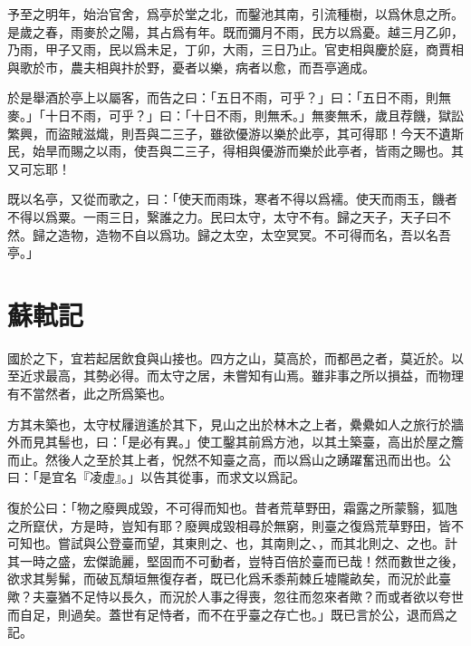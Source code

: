 予至之明年，始治官舍，爲亭於堂之北，而鑿池其南，引流種樹，以爲休息之所。是歲之春，雨麥於之陽，其占爲有年。既而彌月不雨，民方以爲憂。越三月乙卯，乃雨，甲子又雨，民以爲未足，丁卯，大雨，三日乃止。官吏相與慶於庭，商賈相與歌於市，農夫相與{抃}於野，憂者以樂，病者以愈，而吾亭適成。%

於是舉酒於亭上以屬客，而告之曰：「五日不雨，可乎？」曰：「五日不雨，則無麥。」「十日不雨，可乎？」曰：「十日不雨，則無禾。」無麥無禾，歲且{荐}饑，獄訟繁興，而盜賊滋熾，則吾與二三子，雖欲優游以樂於此亭，其可得耶！今天不遺斯民，始旱而賜之以雨，使吾與二三子，得相與優游而樂於此亭者，皆雨之賜也。其又可忘耶！%

既以名亭，又從而歌之，曰：「使天而雨珠，寒者不得以爲襦。使天而雨玉，饑者不得以爲粟。一雨三日，{繄}誰之力。民曰太守，太守不有。歸之天子，天子曰不然。歸之造物，造物不自以爲功。歸之太空，太空冥冥。不可得而名，吾以名吾亭。」%

\theendnotes

\section[凌虛臺記\quad{\small 蘇軾}]{{\normalsize 蘇軾}\quad {}記}
國於之下，宜若起居飲食與山接也。四方之山，莫高於，而都邑之者，莫近於。以至近求最高，其勢必得。而太守之居，未嘗知有山焉。雖非事之所以損益，而物理有不當然者，此之所爲築也。

方其未築也，太守杖屨逍遙於其下，見山之出於林木之上者，纍纍如人之旅行於牆外而見其髻也，曰：「是必有異。」使工鑿其前爲方池，以其土築臺，高出於屋之簷而止。然後人之至於其上者，怳然不知臺之高，而以爲山之踴躍奮迅而出也。公曰：「是宜名『凌虛』。」以告其從事，而求文以爲記。%

復於公曰：「物之廢興成毀，不可得而知也。昔者荒草野田，霜露之所蒙翳，狐虺之所竄伏，方是時，豈知有耶？廢興成毀相尋於無窮，則臺之復爲荒草野田，皆不可知也。嘗試與公登臺而望，其東則之、也，其南則之、，而其北則之、之也。計其一時之盛，宏傑詭麗，堅固而不可動者，豈特百倍於臺而已哉！然而數世之後，欲求其髣髴，而破瓦頹垣無復存者，既已化爲禾黍荊棘丘墟隴畝矣，而況於此臺歟？夫臺猶不足恃以長久，而況於人事之得喪，忽往而忽來者歟？而或者欲以夸世而自足，則過矣。蓋世有足恃者，而不在乎臺之存亡也。」既已言於公，退而爲之記。

